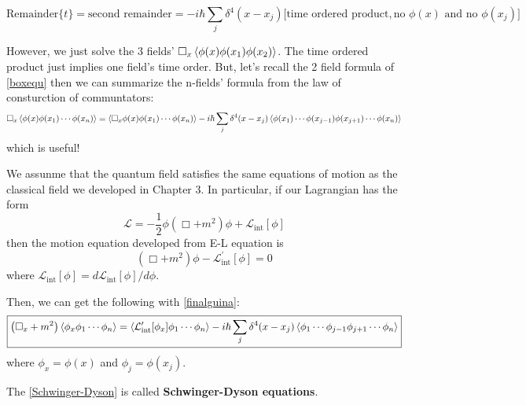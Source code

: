\documentclass[12pt,openany]{book}
\begin{document}
	\begin{equation}
		\text{Remainder}\{t\}=\text{second remainder}=-i\hbar\sum_{j}\delta^4(x-x_j)\big[\text{time ordered product},\text{no}\,\,\phi(x)\,\,\text{and no}\,\,\phi(x_j)\big]
	\end{equation}\par 
	However, we just solve the 3 fields' $\Box_x\braket{\phi(x)\phi(x_1)\phi(x_2)}$. The time ordered product just implies one field's time order. But, let's recall the 2 field 
	formula of \eqref{boxequ} then we can summarize the n-fields' formula from the law of consturction of communtators:
	\begin{equation}\label{finalguina}
			\Box_x\braket{\phi(x)\phi(x_1)\cdots\phi(x_n)}=\braket{\Box_x\phi(x)\phi(x_1)\cdots\phi(x_n)}-i\hbar\sum_{j}\delta^4(x-x_j)\braket{\phi(x_1)\cdots\phi(x_{j-1})\phi(x_{j+1})\cdots\phi(x_n)}
	\end{equation} 
	which is useful!
	\par 
	We assunme that the quantum field satisfies the same equations of motion as the classical field we developed in Chapter 3. In particular,
	if our Lagrangian has the form 
	\begin{equation}
		\mathcal{L}=-\frac{1}{2}\phi(\Box+m^2)\phi+\mathcal{L}_{\text{int}}[\phi]
	\end{equation}
	then the motion equation developed from E-L equation is
	\begin{equation}
		\left(\Box+m^2\right)\phi-\mathcal{L}_{\text{int}}^\prime[\phi]=0
	\end{equation}
	where $\mathcal{L}_{\text{int}}[\phi]=d\mathcal{L}_{\text{int}}[\phi]/{d\phi}$.
	\par 
	Then, we can get the following with \eqref{finalguina}: 
	\begin{equation}\label{Schwinger-Dyson}
	\boxed{	\left(\Box_x+m^2\right)\braket{\phi_x\phi_1\cdots\phi_n}=\braket{\mathcal{L}_{\text{int}}^\prime[\phi_x]\phi_1\cdots\phi_n}-i\hbar\sum_j\delta^4(x-x_j)\braket{\phi_1\cdots\phi_{j-1}\phi_{j+1}\cdots\phi_n}}
	\end{equation}
	where $\phi_x=\phi(x)$ and $\phi_j=\phi(x_j)$.
	\par 
	The \eqref{Schwinger-Dyson} is called \textbf{Schwinger-Dyson equations}.
\end{document}
